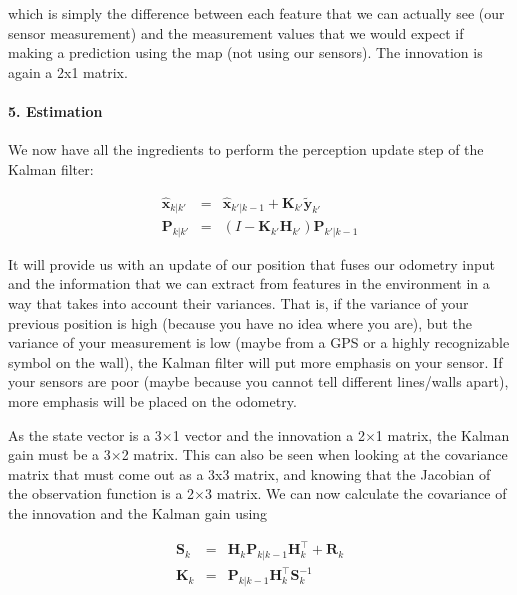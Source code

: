 which is simply the difference between each feature that we can actually see (our sensor measurement) and the measurement values that we would expect if making a prediction using the map (not using our sensors). The innovation is again a 2x1 matrix.

\paragraph{5. Estimation}
We now have all the ingredients to perform the perception update step of the Kalman filter:

\begin{eqnarray}
\hat{\boldsymbol{x}}_{k|k'} &=& \hat{\boldsymbol{x}}_{k'|k-1} + \boldsymbol{K}_{k'}\tilde{\boldsymbol{y}}_{k'}\\
\boldsymbol{P}_{k|k'} &=& (I - \boldsymbol{K}_{k'} {\boldsymbol{H}_{k'}}) \boldsymbol{P}_{k'|k-1}
\end{eqnarray}

It will provide us with an update of our position that fuses our odometry input and the information that we can extract from features in the environment in a way that takes into account their variances. That is, if the variance of your previous position is high (because you have no idea where you are), but the variance of your measurement is low (maybe from a GPS or a highly recognizable symbol on the wall), the Kalman filter will put more emphasis on your sensor. If your sensors are poor (maybe because you cannot tell different lines/walls apart), more emphasis will be placed on the odometry.

As the state vector is a 3$\times$1 vector and the innovation a 2$\times$1 matrix, the Kalman gain must be a 3$\times$2 matrix. This can also be seen when looking at the covariance matrix that must come out as a 3x3 matrix, and knowing that the Jacobian of the observation function is a 2$\times$3 matrix. We can now calculate the covariance of the innovation and the Kalman gain using

\begin{eqnarray}
\boldsymbol{S}_{k}&=&{\boldsymbol{H}_{k}}\boldsymbol{P}_{k|k-1}{\boldsymbol{H}_{k}^\top}+\boldsymbol{R}_{k}\\
\boldsymbol{K}_{k}&=&\boldsymbol{P}_{k|k-1}{\boldsymbol{H}_{k}^\top}\boldsymbol{S}_{k}^{-1}
\end{eqnarray}



